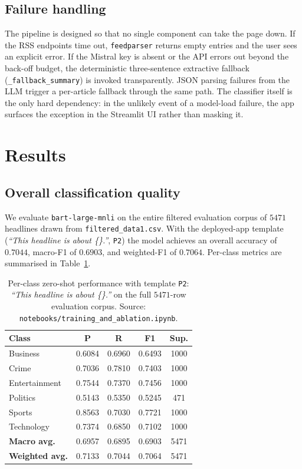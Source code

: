 \documentclass[10pt,twocolumn,letterpaper]{article}
\begin{document}
\subsection{Failure handling}
The pipeline is designed so that no single component can take the page down. If the RSS endpoints time out, \texttt{feedparser} returns empty entries and the user sees an explicit error. If the Mistral key is absent or the API errors out beyond the back-off budget, the deterministic three-sentence extractive fallback (\texttt{\_fallback\_summary}) is invoked transparently. JSON parsing failures from the LLM trigger a per-article fallback through the same path. The classifier itself is the only hard dependency: in the unlikely event of a model-load failure, the app surfaces the exception in the Streamlit UI rather than masking it.

\section{Results}
\label{sec:results}

\subsection{Overall classification quality}
We evaluate \texttt{bart-large-mnli} on the entire filtered evaluation corpus of $5471$ headlines drawn from \texttt{filtered\_data1.csv}. With the deployed-app template (\textit{``This headline is about \{\}.''}, \texttt{P2}) the model achieves an overall accuracy of $\mathbf{0.7044}$, macro-F1 of $\mathbf{0.6903}$, and weighted-F1 of $\mathbf{0.7064}$. Per-class metrics are summarised in Table~\ref{tab:cls}.

\begin{table}[t]
\centering
\caption{Per-class zero-shot performance with template \texttt{P2}: \textit{``This headline is about \{\}.''} on the full $5471$-row evaluation corpus. Source: \texttt{notebooks/training\_and\_ablation.ipynb}.}
\label{tab:cls}
\small
\begin{tabular}{lcccc}
\toprule
\textbf{Class} & \textbf{P} & \textbf{R} & \textbf{F1} & \textbf{Sup.} \\
\midrule
Business      & 0.6084 & 0.6960 & 0.6493 & 1000 \\
Crime         & 0.7036 & 0.7810 & 0.7403 & 1000 \\
Entertainment & 0.7544 & 0.7370 & 0.7456 & 1000 \\
Politics      & 0.5143 & 0.5350 & 0.5245 & \phantom{0}471 \\
Sports        & 0.8563 & 0.7030 & 0.7721 & 1000 \\
Technology    & 0.7374 & 0.6850 & 0.7102 & 1000 \\
\midrule
\textbf{Macro avg.}     & 0.6957 & 0.6895 & 0.6903 & 5471 \\
\textbf{Weighted avg.}  & 0.7133 & 0.7044 & 0.7064 & 5471 \\
\bottomrule
\end{tabular}
\end{table}
\end{document}
